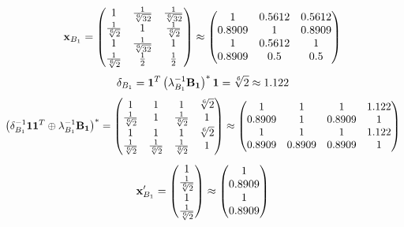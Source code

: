 \documentclass[10pt,a4paper]{article}
\begin{document}
	\[
		\bold{x}_{B_1} = 
		\begin{pmatrix}
			{1} {} & \frac{1} {\sqrt[6]{32}} & \frac{1} {\sqrt[6]{32}} \\
			\frac{1} {\sqrt[6]{2}} & {1} {} & \frac{1} {\sqrt[6]{2}} \\
			{1} {} & \frac{1} {\sqrt[6]{32}} & {1} {} \\
			\frac{1} {\sqrt[6]{2}} & \frac{1} {{2}} & \frac{1} {{2}} \\
		\end{pmatrix}
		\approx
		\begin{pmatrix}
			1        & 0.5612   & 0.5612   \\
			0.8909   & 1        & 0.8909   \\
			1        & 0.5612   & 1        \\
			0.8909   & 0.5      & 0.5      \\
		\end{pmatrix}
	\]
	\[
		\delta_{B_1} = \bold{1}^T \left(\lambda_{B_1}^{-1}\bold{B_1}\right)^* \bold{1} = {\sqrt[6]{2}} {}\approx 1.122
	\]
	\[
		\left(\delta_{B_1}^{-1}\bold{11}^T \oplus \lambda_{B_1}^{-1}\bold{B_1}\right)^* = 
		\begin{pmatrix}
			{1} {} & {1} {} & {1} {} & {\sqrt[6]{2}} {} \\
			\frac{1} {\sqrt[6]{2}} & {1} {} & \frac{1} {\sqrt[6]{2}} & {1} {} \\
			{1} {} & {1} {} & {1} {} & {\sqrt[6]{2}} {} \\
			\frac{1} {\sqrt[6]{2}} & \frac{1} {\sqrt[6]{2}} & \frac{1} {\sqrt[6]{2}} & {1} {} \\
		\end{pmatrix}
		\approx
		\begin{pmatrix}
			1        & 1        & 1        & 1.122    \\
			0.8909   & 1        & 0.8909   & 1        \\
			1        & 1        & 1        & 1.122    \\
			0.8909   & 0.8909   & 0.8909   & 1        \\
		\end{pmatrix}
	\]
	\[
		\bold{x}'_{B_1} = 
		\begin{pmatrix}
			{1} {} \\
			\frac{1} {\sqrt[6]{2}} \\
			{1} {} \\
			\frac{1} {\sqrt[6]{2}} \\
		\end{pmatrix}
		\approx
		\begin{pmatrix}
			1        \\
			0.8909   \\
			1        \\
			0.8909   \\
		\end{pmatrix}
	\]
\end{document}

